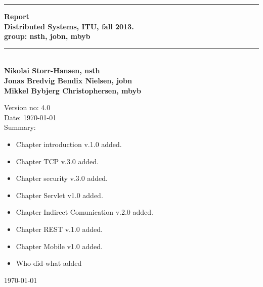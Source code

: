 \begin{titlepage}
\begin{center}
\rule{430pt}{3pt}
 {\huge\bfseries Report\\ }
 {\normalsize\bfseries Distributed Systems, ITU, fall 2013.\\ group: nsth, jobn, mbyb} 
  
 \rule{430pt}{3pt}\\[1cm]
 
 {\normalsize\bfseries Nikolai Storr-Hansen, nsth} \\
 {\normalsize\bfseries Jonas Bredvig Bendix Nielsen, jobn} \\
 {\normalsize\bfseries Mikkel Bybjerg Christophersen, mbyb} \\

 \vspace{2cm}
\end{center}


Version no: 4.0 \\

Date: \today \\

Summary: \\
 
\begin{itemize}

\item Chapter introduction v.1.0 added.

\item Chapter TCP v.3.0 added.

\item Chapter security v.3.0 added.

\item Chapter Servlet v1.0 added. 

\item Chapter Indirect Comunication v.2.0 added.

\item Chapter REST v.1.0 added.

\item Chapter Mobile v1.0 added.

\item Who-did-what added
\end{itemize}


\begin{center}

 \vfill
\textsl{}
 \vfill
{\today}
\end{center}
\end{titlepage}